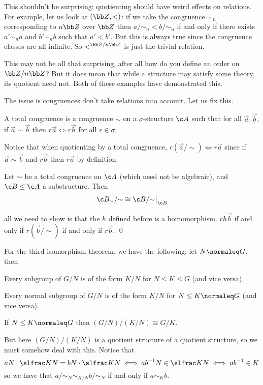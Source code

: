 This shouldn't be surprising: quotienting should have weird effects on relations.
For example, let us look at $({\bb Z},<)$: if we take the congruence $\sim_n$ corresponding to $n{\bb Z}$ over ${\bb Z}$ then $a/\sim_n<b/\sim_n$ if and only if there exists $a'\sim_na$ and $b'\sim_nb$ such
that $a'<b'$.
But this is always true since the congruence classes are all infinite.
So $<^{{\bb Z}/n{\bb Z}}$ is just the trivial relation.

This may not be all that surprising, after all how do you define an order on ${\bb Z}/n{\bb Z}$?
But it does mean that while a structure may satisfy some theory, its quotient need not.
Both of these examples have demonstrated this.

The issue is congruences don't take relations into account.
Let us fix this.

\bdefn

    A {\emphcolor total congruence} is a congruence $\sim$ on a $\sigma$-structure $\c A$ such that for all $\vec a,\vec b$, if $\vec a\sim\vec b$ then $r\vec a\iff r\vec b$ for all $r\in\sigma$.

\edefn

Notice that when quotienting by a total congruence, $r(\vec a/{\sim})\iff r\vec a$ since if $\vec a\sim\vec b$ and $r\vec b$ then $r\vec a$ by definition.

\bthrm[title=The Second Isomorphism Theorem{,} Relational-Style]

    Let $\sim$ be a total congruence on $\c A$ (which need not be algebraic), and $\c B\leq\c A$ a substructure.
    Then
    $$ \c B_\sim/{\sim}\cong\c B/{\sim}\bigr|_{\c B} $$

\ethrm

\Proof all we need to show is that the $h$ defined before is a homomorphism.
$rh\vec b$ if and only if $r(\vec b/{\sim})$ if and only if $r\vec b$.
\qed

\medskip
For the third isomorphism theorem, we have the following: let $N\normaleq G$, then
\benum
    \item Every subgroup of $G/N$ is of the form $K/N$ for $N\leq K\leq G$ (and vice versa).
    \item Every normal subgroup of $G/N$ is of the form $K/N$ for $N\leq K\normaleq G$ (and vice versa).
    \item If $N\leq K\normaleq G$ then $(G/N)/(K/N)\cong G/K$.
\eenum

But here $(G/N)/(K/N)$ is a quotient structure of a quotient structure, so we must somehow deal with this.
Notice that
$$ aN\cdot\slfrac KN = bN\cdot\slfrac KN \iff ab^{-1}N \in \slfrac KN \iff ab^{-1} \in K $$
so we have that $a/{\sim_N}\sim_{K/N}b/{\sim_N}$ if and only if $a\sim_Kb$.

